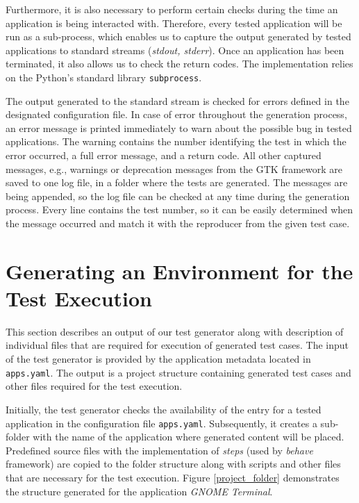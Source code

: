 Furthermore, it is also necessary to perform certain checks during the time an application is being interacted with. Therefore, every tested application will be run as a sub-process, which enables us to capture the output generated by tested applications to standard streams (\textit{stdout, stderr}). Once an application has been terminated, it also allows us to check the return codes. The implementation relies on the Python's standard library \texttt{subprocess}. 

The output generated to the standard stream is checked for errors defined in the designated configuration file. In case of error throughout the generation process, an error message is printed immediately to warn about the possible bug in tested applications. The warning contains the number identifying the test in which the error occurred, a full error message, and a return code. All other captured messages, e.g., warnings or deprecation messages from the GTK framework are saved to one log file, in a folder where the tests are generated. The messages are being appended, so the log file can be checked at any time during the generation process. Every line contains the test number, so it can be easily determined when the message occurred and match it with the reproducer from the given test case.

\section{Generating an Environment for the Test Execution}\label{generator_output}
This section describes an output of our test generator along with description of individual files that are required for execution of generated test cases. The input of the test generator is provided by the application metadata located in \texttt{apps.yaml}. The output is a project structure containing generated test cases and other files required for the test execution. 

Initially, the test generator checks the availability of the entry for a tested application in the configuration file \texttt{apps.yaml}. Subsequently, it creates a sub-folder with the name of the application where generated content will be placed. Predefined source files with the implementation of \textit{steps} (used by \textit{behave} framework) are copied to the folder structure along with scripts and other files that are necessary for the test execution. Figure \ref{project_folder} demonstrates the structure generated for the application \textit{GNOME Terminal}.

